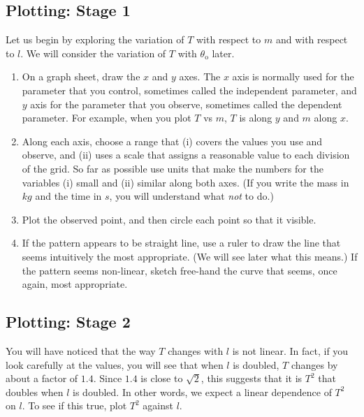 \subsection{Plotting: Stage 1}
Let us begin by exploring the variation of $T$ with respect to $m$ and with respect to $l$. We will consider the variation of $T$ with $\theta_\text{o}$ later. 
\vspace{-0.5cm}
\begin{enumerate}
\itemsep0em
    \item On a graph sheet, draw the $x$ and $y$ axes. The $x$ axis is normally used for the parameter that you control, sometimes called the independent parameter, and $y$ axis for the parameter that you observe, sometimes called the dependent parameter. For example, when you plot $T$ vs $m$, $T$ is along $y$ and $m$ along $x$. 
    
    \item Along each axis, choose a range that (i) covers the values you use and observe, and (ii) uses a scale that assigns a reasonable value to each division of the grid. So far as possible use units that make the numbers for the variables (i) small and (ii) similar along both axes. (If you write the mass in $kg$ and the time in $s$, you will understand what \textit{not} to do.)
    
    \item Plot the observed point, and then circle each point so that it visible. 
    
    \item If the pattern appears to be straight line, use a ruler to draw the line that seems intuitively the most appropriate. (We will see later what this means.) If the pattern seems non-linear, sketch free-hand the curve that seems, once again, most appropriate.
    
\end{enumerate}

\subsection{Plotting: Stage 2}

You will have noticed that the way $T$ changes with $l$ is not linear. In fact, if you look carefully at the values, you will see that when $l$ is doubled, $T$ changes by about a factor of $1.4$. Since $1.4$ is close to $\sqrt{2}$, this suggests that it is $T^2$ that doubles when $l$ is doubled. In other words, we expect a linear dependence of $T^2$ on $l$. To see if this true, plot $T^2$ against $l$.

